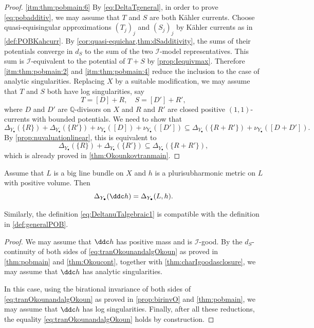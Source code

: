 \begin{proof}
\ref{itm:thm:pobmain:6} By \eqref{eq:DeltaTgeneral}, in order to prove \eqref{eq:pobadditiv}, we may assume that $T$ and $S$ are both Kähler currents. Choose quasi-equisingular approximations $(T_j)_j$ and $(S_j)_j$ by Kähler currents as in \cref{def:POBKahcurr}. By \cref{cor:quasi-equichar,thm:dSadditivity}, the sums of their potentials converge in $d_S$ to the sum of the two $\mathcal I$-model representatives. This sum is $\mathcal I$-equivalent to the potential of $T+S$ by \cref{prop:Iequivmax}. Therefore \ref{itm:thm:pobmain:2} and \ref{itm:thm:pobmain:4} reduce the inclusion to the case of analytic singularities. Replacing $X$ by a suitable modification, we may assume that $T$ and $S$ both have log singularities, say
\[
T=[D]+R,\quad S=[D']+R',
\]
where $D$ and $D'$ are $\mathbb{Q}$-divisors on $X$ and $R$ and $R'$ are closed positive $(1,1)$-currents with bounded potentials. We need to show that
\[
\Delta_{Y_{\bullet}}(\{R\})+\Delta_{Y_{\bullet}}(\{R'\})+\nu_{Y_{\bullet}}([D])+\nu_{Y_{\bullet}}([D'])\subseteq \Delta_{Y_{\bullet}}(\{R+R'\})+\nu_{Y_{\bullet}}([D+D']).
\]
By \cref{prop:nuvaluationlinear}, this is equivalent to
\[
\Delta_{Y_{\bullet}}(\{R\})+\Delta_{Y_{\bullet}}(\{R'\})\subseteq \Delta_{Y_{\bullet}}(\{R+R'\}),
\]
which is already proved in \cref{thm:Okounkovtranmain}.
\end{proof}

\begin{corollary}\label{cor:transalgPOB}
Assume that $L$ is a big line bundle on $X$ and $h$ is a plurisubharmonic metric on $L$ with positive volume. Then
\begin{equation}\label{eq:tranOkounandalgOkoun}
\Delta_{Y_{\bullet}}(\ddc h)=\Delta_{Y_{\bullet}}(L,h).
\end{equation}
\end{corollary}
Similarly, the definition \eqref{eq:DeltanuTalgebraic1} is compatible with the definition in \cref{def:generalPOB}.
\begin{proof}
    We may assume that $\ddc h$ has positive mass and is $\mathcal{I}$-good. By the $d_S$-continuity of both sides of \eqref{eq:tranOkounandalgOkoun} as proved in \cref{thm:pobmain} and \cref{thm:Okoucont}, together with \cref{thm:charIgoodasclosure}, we may assume that $\ddc h$ has analytic singularities.

    In this case, using the birational invariance of both sides of \eqref{eq:tranOkounandalgOkoun} as proved in \cref{prop:birinvO} and \cref{thm:pobmain}, we may assume that $\ddc h$ has log singularities. Finally, after all these reductions, the equality \eqref{eq:tranOkounandalgOkoun} holds by construction.
\end{proof}



